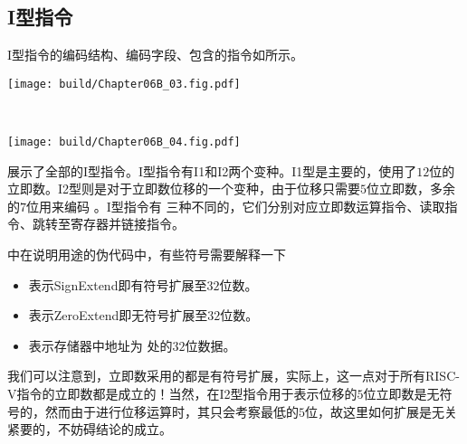 \subsection{I型指令}
I型指令的编码结构、编码字段、包含的指令如所示。

\begin{Figure}[I型指令的编码]
    \begin{FigureSub}[I1型指令的编码]
        \texttt{[image: build/Chapter06B\_03.fig.pdf]}
    \end{FigureSub}\\ \vspace{0.5cm}
    \begin{FigureSub}[I2型指令的编码]
        \texttt{[image: build/Chapter06B\_04.fig.pdf]}
    \end{FigureSub}
\end{Figure}
展示了全部的I型指令。I型指令有I1和I2两个变种。I1型是主要的，使用了$12$位的立即数。I2型则是对于立即数位移的一个变种，由于位移只需要$5$位立即数，多余的$7$位用来编码 。I型指令有 三种不同的，它们分别对应立即数运算指令、读取指令、跳转至寄存器并链接指令。

中在说明用途的伪代码中，有些符号需要解释一下
\begin{itemize}
    \item {} 表示SignExtend即有符号扩展至$32$位数。
    \item {} 表示ZeroExtend即无符号扩展至$32$位数。
    \item \codex{[Address]} 表示存储器中地址为 处的$32$位数据。
\end{itemize}
我们可以注意到，立即数采用的都是有符号扩展，实际上，这一点对于所有RISC-V指令的立即数都是成立的！当然，在I2型指令用于表示位移的$5$位立即数是无符号的，然而由于进行位移运算时，其只会考察最低的$5$位，故这里如何扩展是无关紧要的，不妨碍结论的成立。

